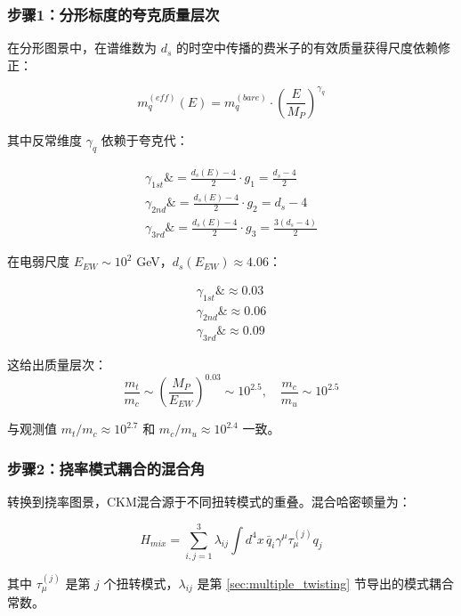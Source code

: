 \subsubsection{步骤1：分形标度的夸克质量层次}

在分形图景中，在谱维数为 $d_s$ 的时空中传播的费米子的有效质量获得尺度依赖修正：

\begin{equation}
    m_q^{(eff)}(E) = m_q^{(bare)} \cdot \left(\frac{E}{M_P}\right)^{\gamma_q}
\end{equation}

其中反常维度 $\gamma_q$ 依赖于夸克代：

\begin{align}
    \gamma_{1st} \&= \frac{d_s(E) - 4}{2} \cdot g_1 = \frac{d_s - 4}{2} \\
    \gamma_{2nd} \&= \frac{d_s(E) - 4}{2} \cdot g_2 = d_s - 4 \\
    \gamma_{3rd} \&= \frac{d_s(E) - 4}{2} \cdot g_3 = \frac{3(d_s - 4)}{2}
\end{align}

在电弱尺度 $E_{EW} \sim 10^2$ GeV，$d_s(E_{EW}) \approx 4.06$：

\begin{align}
    \gamma_{1st} \&\approx 0.03 \\
    \gamma_{2nd} \&\approx 0.06 \\
    \gamma_{3rd} \&\approx 0.09
\end{align}

这给出质量层次：
\begin{equation}
    \frac{m_t}{m_c} \sim \left(\frac{M_P}{E_{EW}}\right)^{0.03} \sim 10^{2.5}, \quad
    \frac{m_c}{m_u} \sim 10^{2.5}
\end{equation}

与观测值 $m_t/m_c \approx 10^{2.7}$ 和 $m_c/m_u \approx 10^{2.4}$ 一致。

\subsubsection{步骤2：挠率模式耦合的混合角}

转换到挠率图景，CKM混合源于不同扭转模式的重叠。混合哈密顿量为：

\begin{equation}
    H_{mix} = \sum_{i,j=1}^3 \lambda_{ij} \int d^4x \, \bar{q}_i \gamma^\mu \tau_\mu^{(j)} q_j
\end{equation}

其中 $\tau_\mu^{(j)}$ 是第 $j$ 个扭转模式，$\lambda_{ij}$ 是第 \ref{sec:multiple_twisting} 节导出的模式耦合常数。

